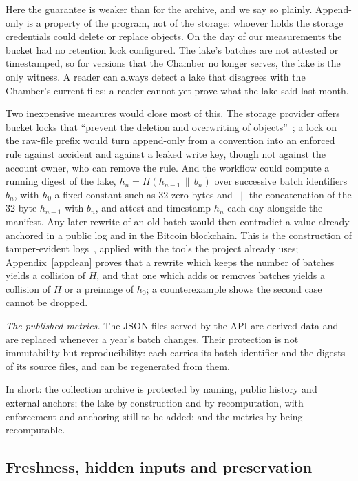 Here the guarantee is weaker than for the archive, and we say so plainly. Append-only is a property of the program, not of the storage: whoever holds the storage credentials could delete or replace objects. On the day of our measurements the bucket had no retention lock configured. The lake's batches are not attested or timestamped, so for versions that the Chamber no longer serves, the lake is the only witness. A reader can always detect a lake that disagrees with the Chamber's current files; a reader cannot yet prove what the lake said last month.

Two inexpensive measures would close most of this. The storage provider offers bucket locks that ``prevent the deletion and overwriting of objects''~\citep{cloudflare-bucketlocks}; a lock on the raw-file prefix would turn append-only from a convention into an enforced rule against accident and against a leaked write key, though not against the account owner, who can remove the rule. And the workflow could compute a running digest of the lake, $h_n = H(h_{n-1} \,\|\, b_n)$ over successive batch identifiers $b_n$, with $h_0$ a fixed constant such as 32 zero bytes and $\|$ the concatenation of the 32-byte $h_{n-1}$ with $b_n$, and attest and timestamp $h_n$ each day alongside the manifest. Any later rewrite of an old batch would then contradict a value already anchored in a public log and in the Bitcoin blockchain. This is the construction of tamper-evident logs~\citep{crosby2009tamper}, applied with the tools the project already uses; Appendix~\ref{app:lean} proves that a rewrite which keeps the number of batches yields a collision of $H$, and that one which adds or removes batches yields a collision of $H$ or a preimage of $h_0$; a counterexample shows the second case cannot be dropped.

\emph{The published metrics.} The JSON files served by the API are derived data and are replaced whenever a year's batch changes. Their protection is not immutability but reproducibility: each carries its batch identifier and the digests of its source files, and can be regenerated from them.

In short: the collection archive is protected by naming, public history and external anchors; the lake by construction and by recomputation, with enforcement and anchoring still to be added; and the metrics by being recomputable.

\subsection{Freshness, hidden inputs and preservation}
\label{sec:freshness}

